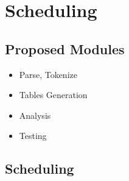 \chapter{Scheduling}


\section{Proposed Modules}
\begin{itemize}
\item Parse, Tokenize
\item Tables Generation
\item Analysis
\item Testing
\end{itemize}
\section{Scheduling}
